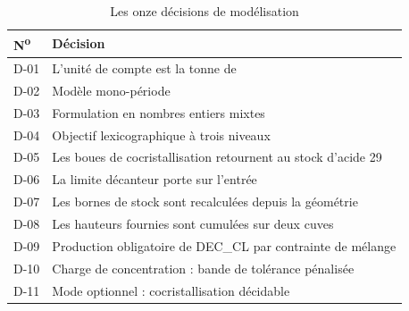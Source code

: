 \begin{table}[H]
\centering
\caption{Les onze décisions de modélisation}
\label{tab:decisions}
\begin{tabular}{@{}lp{9.5cm}@{}}
\toprule
\textbf{N\textsuperscript{o}} & \textbf{Décision} \\
\midrule
D-01 & L'unité de compte est la tonne de \PdeuxOcinq{} \\
D-02 & Modèle mono-période \\
D-03 & Formulation en nombres entiers mixtes \\
D-04 & Objectif lexicographique à trois niveaux \\
D-05 & Les boues de cocristallisation retournent au stock d'acide 29 \\
D-06 & La limite décanteur porte sur l'entrée \\
D-07 & Les bornes de stock sont recalculées depuis la géométrie \\
D-08 & Les hauteurs fournies sont cumulées sur deux cuves \\
D-09 & Production obligatoire de DEC\_CL par contrainte de mélange \\
D-10 & Charge de concentration : bande de tolérance pénalisée \\
D-11 & Mode optionnel : cocristallisation décidable \\
\bottomrule
\end{tabular}
\end{table}
